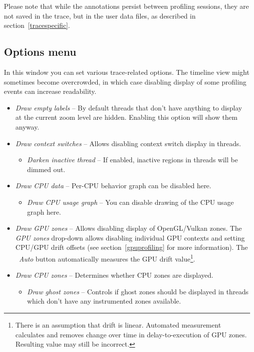 \documentclass[hidelinks,titlepage,a4paper]{article}
\begin{document}
Please note that while the annotations persist between profiling sessions, they are not saved in the trace, but in the user data files, as described in section~\ref{tracespecific}.

\subsection{Options menu}
\label{options}

In this window you can set various trace-related options. The timeline view might sometimes become overcrowded, in which case disabling display of some profiling events can increase readability.

\begin{itemize}
\item \emph{\faExpand{} Draw empty labels} -- By default threads that don't have anything to display at the current zoom level are hidden. Enabling this option will show them anyway.
\item \emph{\faHiking{} Draw context switches} -- Allows disabling context switch display in threads.
\begin{itemize}
\item \emph{\faMoon{} Darken inactive thread} -- If enabled, inactive regions in threads will be dimmed out.
\end{itemize}
\item \emph{\faSlidersH{} Draw CPU data} -- Per-CPU behavior graph can be disabled here.
\begin{itemize}
\item \emph{\faSignature{} Draw CPU usage graph} -- You can disable drawing of the CPU usage graph here.
\end{itemize}
\item \emph{\faEye{} Draw GPU zones} -- Allows disabling display of OpenGL/Vulkan zones. The \emph{GPU zones} drop-down allows disabling individual GPU contexts and setting CPU/GPU drift offsets (see section~\ref{gpuprofiling} for more information). The \emph{\faRobot~Auto} button automatically measures the GPU drift value\footnote{There is an assumption that drift is linear. Automated measurement calculates and removes change over time in delay-to-execution of GPU zones. Resulting value may still be incorrect.}.
\item \emph{\faMicrochip{} Draw CPU zones} -- Determines whether CPU zones are displayed.
\begin{itemize}
\item \emph{\faGhost{} Draw ghost zones} -- Controls if ghost zones should be displayed in threads which don't have any instrumented zones available.

\end{itemize}
\end{itemize}
\end{document}
